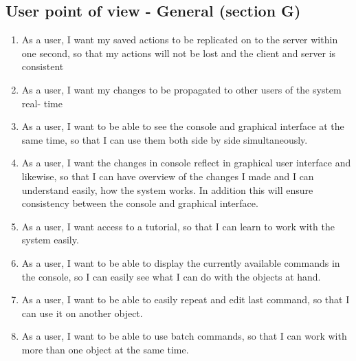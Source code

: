 \subsection{User point of view - General (section G)}
\begin{enumerate}
  \item As a user, I want my saved actions to be replicated on to the server within one second, so that my actions will not be lost and the client and server is consistent
  \item As a user, I want my changes to be propagated to other users of the system real- time
  \item As a user, I want to be able to see the console and graphical interface at the same time, so that I can use them both side by side simultaneously.
  \item As a user, I want the changes in console reflect in graphical user interface and likewise, so that I can have overview of the changes I made and I can understand easily, how the system works. In addition this will ensure consistency between the console and graphical interface.
  \item As a user, I want access to a tutorial, so that I can learn to work with the system easily.
  \item As a user, I want to be able to display the currently available commands in the console, so I can easily see what I can do with the objects at hand.
  \item As a user, I want to be able to easily repeat and edit last command, so that I can use it on another object.
  \item As a user, I want to be able to use batch commands, so that I can work with more than one object at the same time.
\end{enumerate}

